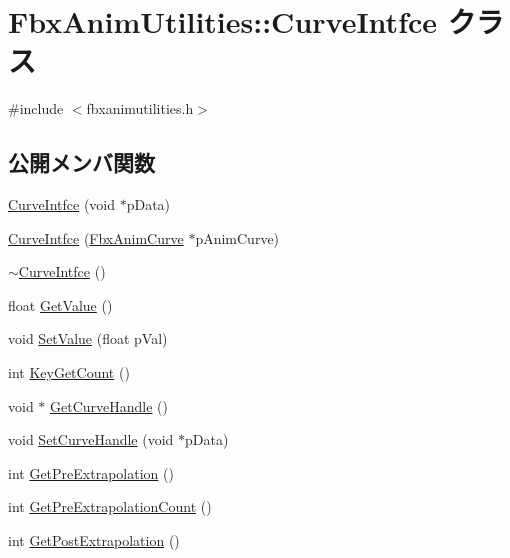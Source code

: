 \hypertarget{class_fbx_anim_utilities_1_1_curve_intfce}{}\section{Fbx\+Anim\+Utilities\+:\+:Curve\+Intfce クラス}
\label{class_fbx_anim_utilities_1_1_curve_intfce}


{\ttfamily \#include $<$fbxanimutilities.\+h$>$}

\subsection*{公開メンバ関数}
\begin{DoxyCompactItemize}
\item 
\hyperlink{class_fbx_anim_utilities_1_1_curve_intfce_abe47bbd049aff725a33efffae4b1e8cd}{Curve\+Intfce} (void $\ast$p\+Data)
\item 
\hyperlink{class_fbx_anim_utilities_1_1_curve_intfce_a1b518674affee28cd9799180e3e50784}{Curve\+Intfce} (\hyperlink{class_fbx_anim_curve}{Fbx\+Anim\+Curve} $\ast$p\+Anim\+Curve)
\item 
\hyperlink{class_fbx_anim_utilities_1_1_curve_intfce_a67e04ca206e9732c546a8159c69d8306}{$\sim$\+Curve\+Intfce} ()
\item 
float \hyperlink{class_fbx_anim_utilities_1_1_curve_intfce_ad63c5ffadba6d63195fe19e50ed643da}{Get\+Value} ()
\item 
void \hyperlink{class_fbx_anim_utilities_1_1_curve_intfce_a75424a5a32b82fa4b559ebb01b56de99}{Set\+Value} (float p\+Val)
\item 
int \hyperlink{class_fbx_anim_utilities_1_1_curve_intfce_a3de48a3e798575552845f49e92f9b7a6}{Key\+Get\+Count} ()
\item 
void $\ast$ \hyperlink{class_fbx_anim_utilities_1_1_curve_intfce_a42874cc8b9cea4f9f54d372ed7618292}{Get\+Curve\+Handle} ()
\item 
void \hyperlink{class_fbx_anim_utilities_1_1_curve_intfce_a25304c3fd50fe899fef1e0aa5c64457e}{Set\+Curve\+Handle} (void $\ast$p\+Data)
\item 
int \hyperlink{class_fbx_anim_utilities_1_1_curve_intfce_ad13aeb24eaeb452006befeaaf4298592}{Get\+Pre\+Extrapolation} ()
\item 
int \hyperlink{class_fbx_anim_utilities_1_1_curve_intfce_aff91ed29386e1f33886319b96cc069e8}{Get\+Pre\+Extrapolation\+Count} ()
\item 
int \hyperlink{class_fbx_anim_utilities_1_1_curve_intfce_a8293926c8713f04614772cfd9bbe2a52}{Get\+Post\+Extrapolation} ()

\end{DoxyCompactItemize}
